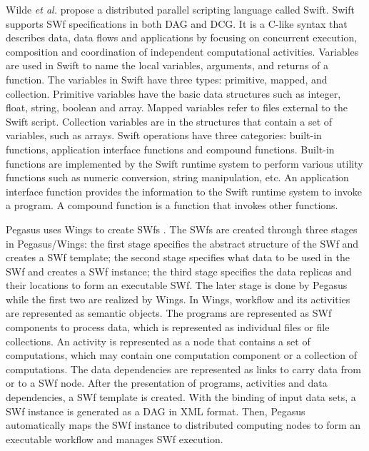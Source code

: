 Wilde \textit{et al.} \cite{Wilde2011}
propose a distributed parallel scripting language called Swift. Swift
supports SWf specifications in both DAG and DCG. It
is a C-like syntax that describes data, data flows and applications
by focusing on concurrent execution, composition and coordination
of independent computational activities. Variables are used in Swift
to name the local variables, arguments, and returns of a function.
The variables in Swift have three types: primitive, mapped, and collection.
Primitive variables have the basic data structures such as integer,
float, string, boolean and array. Mapped variables refer to files
external to the Swift script. Collection variables are in the structures that contain a set of variables, such as
arrays. Swift operations have three
categories: built-in functions, application interface functions and
compound functions. Built-in functions are implemented by the Swift
runtime system to perform various utility functions such as numeric
conversion, string manipulation, etc. An application interface function
provides the information to the Swift runtime system to invoke a program.
A compound function is a function that invokes other functions. 

Pegasus uses Wings to create SWfs \cite{Gil2006}. 
The SWfs are created through 
three stages in Pegasus/Wings: the first stage specifies the abstract structure of the SWf and creates a SWf template; the second stage specifies what data to 
be used in the SWf and creates a SWf instance; the third stage specifies the data replicas and their locations to form an executable SWf.
The later stage is done by Pegasus while the first two are realized by Wings.
In Wings, workflow and its activities are represented as semantic objects. 
The programs are represented as SWf components to process data, which is represented as individual files or file collections.
An activity is represented as a node that contains a set of computations, which may contain one computation component or
a collection of computations. The data dependencies are represented as links to carry data from or to a SWf node. 
After the presentation of programs, activities and data dependencies, a SWf template is created.
With the binding of input data sets, a SWf instance is generated as a DAG in XML format.
Then, Pegasus automatically maps the SWf instance to distributed computing nodes to 
form an executable workflow and manages SWf execution.


